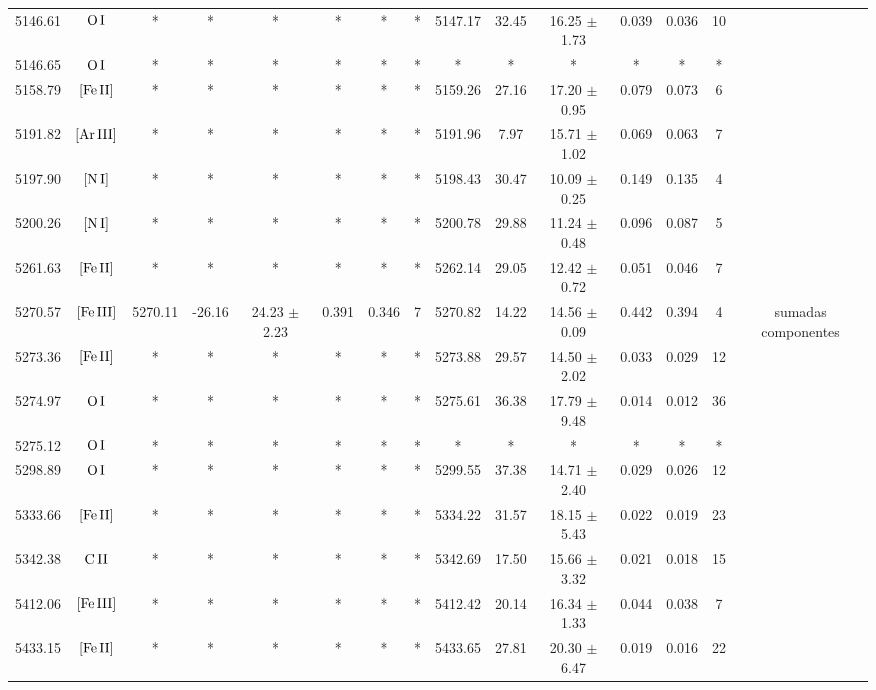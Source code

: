 \documentclass{article}
\begin{document}
\begin{table*}
\begin{adjustbox}{width=\textwidth}
\begin{tabular}{ccccccccccccccc}
5146.61 & $\mbox{O}\thinspace \mbox{I}$ & * & * & * & * & * & * & 5147.17 & 32.45 & 16.25 $\pm$ 1.73 & 0.039 & 0.036 & 10 &  \\
5146.65 & $\mbox{O}\thinspace \mbox{I}$ & * & * & * & * & * & * & * & * & * & * & * & * &  \\
5158.79 & $\mbox{[Fe}\thinspace \mbox{II]}$ & * & * & * & * & * & * & 5159.26 & 27.16 & 17.20 $\pm$ 0.95 & 0.079 & 0.073 & 6 &  \\
5191.82 & $\mbox{[Ar}\thinspace \mbox{III]}$ & * & * & * & * & * & * & 5191.96 & 7.97 & 15.71 $\pm$ 1.02 & 0.069 & 0.063 & 7 &  \\
5197.90 & $\mbox{[N}\thinspace \mbox{I]}$ & * & * & * & * & * & * & 5198.43 & 30.47 & 10.09 $\pm$ 0.25 & 0.149 & 0.135 & 4 &  \\
5200.26 & $\mbox{[N}\thinspace \mbox{I]}$ & * & * & * & * & * & * & 5200.78 & 29.88 & 11.24 $\pm$ 0.48 & 0.096 & 0.087 & 5 &  \\
5261.63 & $\mbox{[Fe}\thinspace \mbox{II]}$ & * & * & * & * & * & * & 5262.14 & 29.05 & 12.42 $\pm$ 0.72 & 0.051 & 0.046 & 7 &  \\
5270.57 & $\mbox{[Fe}\thinspace \mbox{III]}$ & 5270.11 & -26.16 & 24.23 $\pm$ 2.23 & 0.391 & 0.346 & 7 & 5270.82 & 14.22 & 14.56 $\pm$ 0.09 & 0.442 & 0.394 & 4 &  sumadas componentes \\
5273.36 & $\mbox{[Fe}\thinspace \mbox{II]}$ & * & * & * & * & * & * & 5273.88 & 29.57 & 14.50 $\pm$ 2.02 & 0.033 & 0.029 & 12 &  \\
5274.97 & $\mbox{O}\thinspace \mbox{I}$ & * & * & * & * & * & * & 5275.61 & 36.38 & 17.79 $\pm$ 9.48 & 0.014 & 0.012 & 36 &  \\
5275.12 & $\mbox{O}\thinspace \mbox{I}$ & * & * & * & * & * & * & * & * & * & * & * & * &  \\
5298.89 & $\mbox{O}\thinspace \mbox{I}$ & * & * & * & * & * & * & 5299.55 & 37.38 & 14.71 $\pm$ 2.40 & 0.029 & 0.026 & 12 &  \\
5333.66 & $\mbox{[Fe}\thinspace \mbox{II]}$ & * & * & * & * & * & * & 5334.22 & 31.57 & 18.15 $\pm$ 5.43 & 0.022 & 0.019 & 23 &  \\
5342.38 & $\mbox{C}\thinspace \mbox{II}$ & * & * & * & * & * & * & 5342.69 & 17.50 & 15.66 $\pm$ 3.32 & 0.021 & 0.018 & 15 &  \\
5412.06 & $\mbox{[Fe}\thinspace \mbox{III]}$ & * & * & * & * & * & * & 5412.42 & 20.14 & 16.34 $\pm$ 1.33 & 0.044 & 0.038 & 7 &  \\
5433.15 & $\mbox{[Fe}\thinspace \mbox{II]}$ & * & * & * & * & * & * & 5433.65 & 27.81 & 20.30 $\pm$ 6.47 & 0.019 & 0.016 & 22 &  \\

\end{tabular}
\end{adjustbox}
\end{table*}
\end{document}
